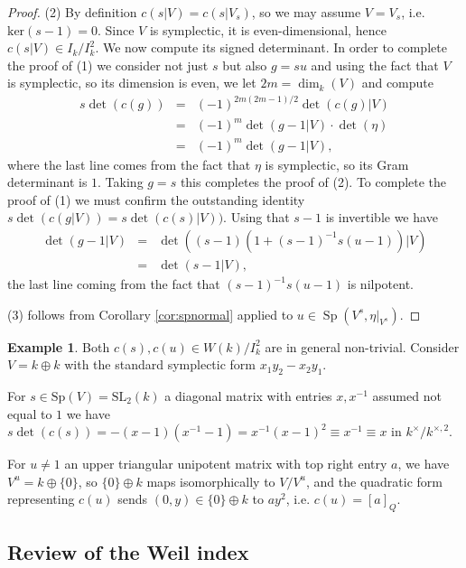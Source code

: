 \documentclass{article}
\def\tx#1{\textrm{#1}}
\DeclareMathOperator{\Sp}{Sp}
\theoremstyle{definition}
\newtheorem{exa}[thm]{Example}
\numberwithin{equation}{subsection}
\renewcommand{\-}{\hyp{}}
\begin{document}
\begin{appendices}
\begin{proof}
	(2) By definition $c(s|V)=c(s|V_s)$, so we may assume $V=V_s$, i.e. $\tx{ker}(s-1)=0$. Since $V$ is symplectic, it is even-dimensional, hence $c(s|V) \in I_k/I_k^2$. We now compute its signed determinant. In order to complete the proof of (1) we consider not just $s$ but also $g=su$ and using the fact that $V$ is symplectic, so its dimension is even, we let $2m=\dim_k(V)$ and compute
		\begin{eqnarray*}
		s\det(c(g))&=&(-1)^{2m(2m-1)/2}\det(c(g)|V)\\
		&=&(-1)^m\det(g-1|V)\cdot\det(\eta)\\
		&=&(-1)^m\det(g-1|V),
	\end{eqnarray*}
	where the last line comes from the fact that $\eta$ is symplectic, so its Gram determinant is $1$. Taking $g=s$ this completes the proof of (2). To complete the proof of (1) we must confirm the outstanding identity $s\det(c(g|V))=s\det(c(s)|V))$. Using that $s-1$ is invertible we have
	\begin{eqnarray*}
		\det(g-1|V)&=&\det((s-1)(1+(s-1)^{-1}s(u-1))|V)\\
		&=&\det(s-1|V),
	\end{eqnarray*}
	the last line coming from the fact that $(s-1)^{-1}s(u-1)$ is nilpotent. 

	(3) follows from Corollary \ref{cor:spnormal} applied to $u \in \Sp(V^s,\eta|_{V^s})$.
\end{proof}

\begin{exa}
	Both $c(s),c(u) \in W(k)/I_k^2$ are in general non-trivial. Consider $V=k \oplus k$ with the standard symplectic form $x_1y_2-x_2y_1$. 
	
	For $s \in \mathrm{Sp}(V)=\mathrm{SL}_2(k)$ a diagonal matrix with entries $x,x^{-1}$ assumed not equal to $1$ we have $s\det(c(s))=-(x-1)(x^{-1}-1)=x^{-1}(x-1)^2\equiv x^{-1} \equiv x$ in $k^\times/k^{\times,2}$. 
	
	For $u \neq 1$ an upper triangular unipotent matrix with top right entry $a$, we have $V^u=k \oplus \{0\}$, so $\{0\} \oplus k$ maps isomorphically to $V/V^u$, and the quadratic form representing $c(u)$ sends $(0,y) \in \{0\} \oplus k$ to $ay^2$, i.e. $c(u)=[a]_Q$.
\end{exa}

\subsection{Review of the Weil index}\label{sub:Weilindex} 


\end{appendices}
\end{document}
